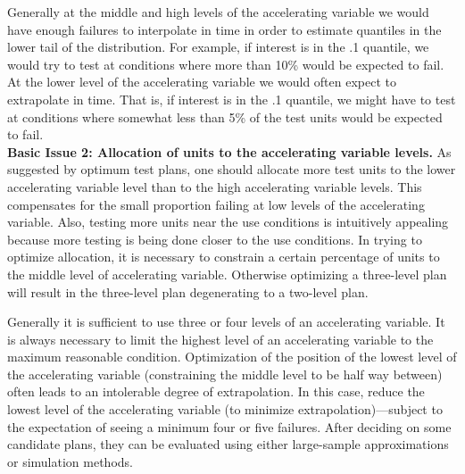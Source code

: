 Generally at the middle and high levels of the accelerating variable
we would have enough failures to interpolate in time in order to
estimate quantiles in the lower tail of the distribution.  For
example, if interest is in the .1 quantile, we would try to test at
conditions where more than 10\% would be expected to fail.  At the
lower level of the accelerating variable we would often expect to
extrapolate in time. That is, if interest is in the .1 quantile, we
might have to test at conditions where somewhat less than 5\%
of the test units would be expected to fail.\\[1ex]

{\bf Basic Issue 2: Allocation of units to the accelerating variable
levels.}  As suggested by optimum test plans, one should allocate
more test units to the lower accelerating variable level than to the
high accelerating variable levels. This compensates for the small
proportion failing at low levels of the accelerating variable.
Also, testing more units near
the use conditions is intuitively appealing because more testing is
being done closer to the use conditions.  In trying to optimize
allocation, it is necessary to constrain a certain percentage of
units to the middle level of accelerating variable. Otherwise
optimizing a three-level plan will result in the three-level plan
degenerating to a two-level plan.

Generally it is sufficient to use three or four levels of an
accelerating variable.  It is always necessary to limit the highest
level of an accelerating variable to the maximum reasonable condition.
Optimization of the position of the lowest level of the accelerating variable
(constraining the middle level to be half way between) often leads to
an intolerable degree of extrapolation. In this case, reduce the
lowest level of the accelerating variable (to minimize
extrapolation)---subject to the expectation of seeing a minimum
four or five failures. After deciding on some candidate plans, they can be
evaluated using either large-sample approximations or simulation
methods.


